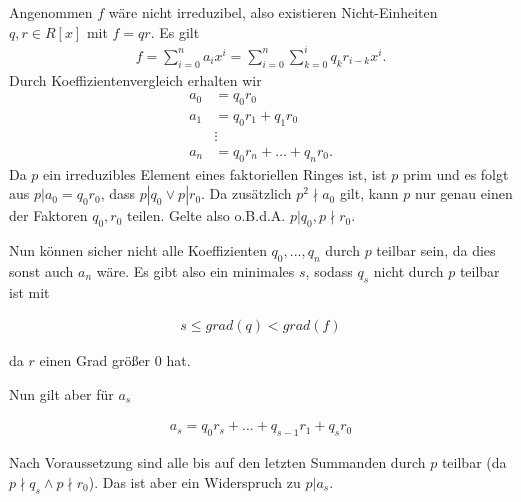 \begin{solution}
Angenommen $f$ wäre nicht irreduzibel, also existieren Nicht-Einheiten $q,r \in R[x]$ mit $f = qr$.
Es gilt
\begin{align*}
  f = \sum_{i=0}^na_ix^i = \sum_{i = 0}^n \sum_{k= 0}^i q_kr_{i-k}x^i.
\end{align*}
Durch Koeffizientenvergleich erhalten wir
\begin{align*}
  a_0 &= q_0r_0 \\
  a_1 &= q_0r_1 + q_1r_0 \\
  &\vdots \\
  a_n &= q_0r_n + \dots + q_nr_0.
\end{align*}
Da $p$ ein irreduzibles Element eines faktoriellen Ringes ist, ist $p$ prim und es folgt
aus $p| a_0 = q_0r_0$, dass $p|q_0 \lor p|r_0$. Da zusätzlich $p^2 \nmid a_0$ gilt,
kann $p$ nur genau einen der Faktoren $q_0,r_0$ teilen. Gelte also o.B.d.A. $p | q_0, p \nmid r_0$.

Nun können sicher nicht alle Koeffizienten $q_0,...,q_n$ durch $p$ teilbar sein, da dies sonst auch $a_n$ wäre. Es gibt also ein minimales $s$, sodass $q_s$ nicht durch $p$ teilbar ist mit

\begin{align*}
  s \leq grad(q) < grad(f)
\end{align*}

da $r$ einen Grad größer $0$ hat.

Nun gilt aber für $a_s$

\begin{align*}
  a_s = q_0 r_s + \dots + q_{s-1}r_1 + q_s r_0
\end{align*}

Nach Voraussetzung sind alle bis auf den letzten Summanden durch $p$ teilbar (da $p \nmid q_s \land p \nmid r_0$). Das ist aber ein Widerspruch zu $p|a_s$.

\end{solution}
